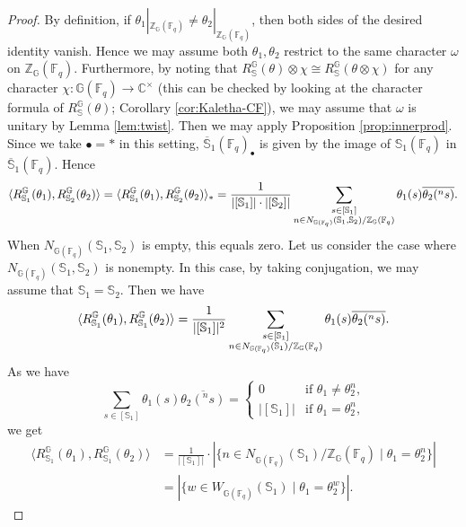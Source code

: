 \documentclass{amsart}
\newcommand{\F}{\mathbb{F}}
\newcommand{\FF}{\mathbb{F}}
\newcommand{\C}{\mathbb{C}}
\newcommand{\bbS}{\mathbb{S}}
\newcommand{\bbG}{\mathbb{G}}
\newcommand{\bbZ}{\mathbb{Z}}
\theoremstyle{plain}
\theoremstyle{definition}
\theoremstyle{remark}
\theoremstyle{theorem}
\begin{document}
\begin{proof}
By definition, if $\theta_1|_{\bbZ_{\bbG}(\FF_q)} \neq \theta_2|_{\bbZ_{\bbG}(\FF_q)}$, then both sides of the desired identity vanish. Hence we may assume both $\theta_1, \theta_2$ restrict to the same character $\omega$ on $\bbZ_{\bbG}(\FF_q)$.
Furthermore, by noting that $R_{\bbS}^{\bbG}(\theta)\otimes\chi\cong R_{\bbS}^{\bbG}(\theta\otimes\chi)$ for any character $\chi\colon\bbG(\F_{q})\rightarrow\C^{\times}$ (this can be checked by looking at the character formula of $R_{\bbS}^{\bbG}(\theta)$; Corollary \ref{cor:Kaletha-CF}), we may assume that $\omega$ is unitary by Lemma \ref{lem:twist}.
Then we may apply Proposition \ref{prop:innerprod}. Since we take $\bullet=\ast$ in this setting, $\overline{\bbS}_{1}(\F_{q})_{\bullet}$ is given by the image of $\bbS_{1}(\F_{q})$ in $\overline{\bbS}_{1}(\F_{q})$.
Hence
\[
\langle R_{\bbS_1}^{\bbG}(\theta_1),R_{\bbS_2}^{\bbG}(\theta_2)\rangle
=\langle R_{\bbS_1}^{\bbG}(\theta_1),R_{\bbS_2}^{\bbG}(\theta_2)\rangle_{\ast}
=
\frac{1}{|[\bbS_{1}]|\cdot|[\bbS_{2}]|}
\sum_{\begin{subarray}{c}s\in[\bbS_{1}] \\ n\in N_{\bbG(\F_{q})}(\bbS_{1},\bbS_{2})/\bbZ_{\bbG}(\F_{q})\end{subarray}}
\theta_{1}(s)\overline{\theta_{2}({}^{n}s)}.
\]
When $N_{\bbG(\F_{q})}(\bbS_{1},\bbS_{2})$ is empty, this equals zero.
Let us consider the case where $N_{\bbG(\F_{q})}(\bbS_{1},\bbS_{2})$ is nonempty.
In this case, by taking conjugation, we may assume that $\bbS_{1}=\bbS_{2}$.
Then we have
\[
\langle R_{\bbS_1}^{\bbG}(\theta_1),R_{\bbS_1}^{\bbG}(\theta_2)\rangle
=
\frac{1}{|[\bbS_{1}]|^{2}}
\sum_{\begin{subarray}{c}s\in[\bbS_{1}] \\ n\in N_{\bbG(\F_{q})}(\bbS_{1})/\bbZ_{\bbG}(\F_{q})\end{subarray}}
\theta_{1}(s)\overline{\theta_{2}({}^{n}s)}.
\]
As we have
\[
\sum_{s\in[\bbS_{1}]}
\theta_{1}(s)\overline{\theta_{2}({}^{n}s)}
=
\begin{cases}
0&\text{if $\theta_{1}\neq\theta_{2}^{n}$,}\\
|[\bbS_{1}]|&\text{if $\theta_{1}=\theta_{2}^{n}$,}
\end{cases}
\]
we get
\begin{align*}
\langle R_{\bbS_1}^{\bbG}(\theta_1),R_{\bbS_1}^{\bbG}(\theta_2)\rangle
&=
\frac{1}{|[\bbS_{1}]|}
\cdot|\{n\in N_{\bbG(\F_{q})}(\bbS_{1})/\bbZ_{\bbG}(\F_{q})\mid \theta_{1}=\theta_{2}^{n}\}|\\
&=
|\{w\in W_{\bbG(\F_{q})}(\bbS_{1})\mid \theta_{1}=\theta_{2}^{w}\}|.
\end{align*}
\end{proof}
\end{document}
